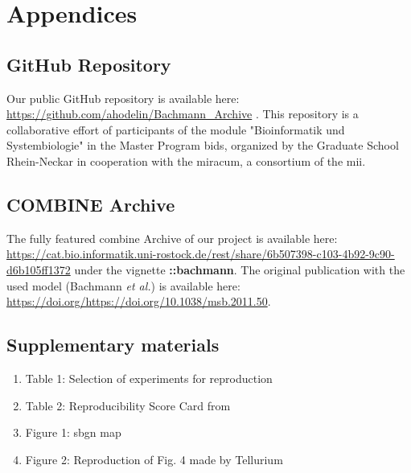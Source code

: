 \newpage
\section*{Appendices}

\subsection*{GitHub Repository} \label{git}

Our public GitHub repository is available here: \url{https://github.com/ahodelin/Bachmann_Archive} \cite{AbelHodelinHernandez.2021}.
This repository is a collaborative effort of participants of the module "Bioinformatik und Systembiologie" in the Master Program \ac{bids}, organized by the Graduate School Rhein-Neckar in cooperation with the \ac{miracum}, a consortium of the \ac{mii}.

\subsection*{COMBINE Archive}

The fully featured \ac{combine} Archive of our project is available here: \url{https://cat.bio.informatik.uni-rostock.de/rest/share/6b507398-c103-4b92-9c90-d6b105ff1372} under the vignette  \textbf{::bachmann}. The original publication with the used model (Bachmann \textit{et al.}) is available here: \url{https://doi.org/https://doi.org/10.1038/msb.2011.50}.

\subsection*{Supplementary materials}
\begin{enumerate}
    \item Table 1: Selection of experiments for reproduction
    \item Table 2: Reproducibility Score Card from \cite{tiwari2021reproducibility}
    \item Figure 1: \ac{sbgn} map 
    \item Figure 2: Reproduction of Fig. 4 made by Tellurium
\end{enumerate}